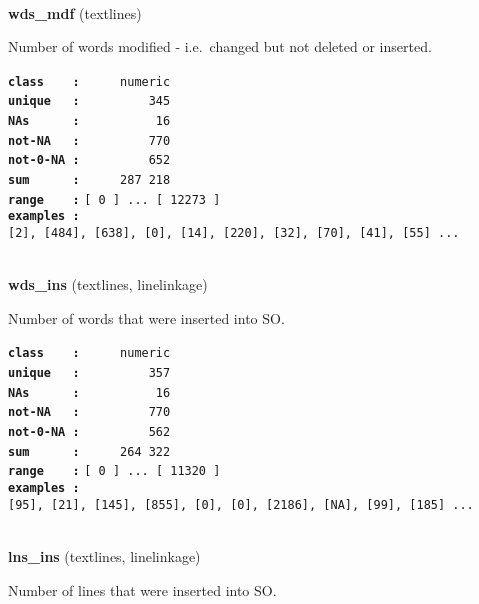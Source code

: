 \documentclass[]{article}
\begin{document}
~

\textbf{wds\_mdf} (textlines)

Number of words modified - i.e.~changed but not deleted or inserted.

\textbf{\texttt{class\ \ \ \ :}} \texttt{~~~~~numeric}\\
\textbf{\texttt{unique\ \ \ :}} \texttt{~~~~~~~~~345}\\
\textbf{\texttt{NAs\ \ \ \ \ \ :}} \texttt{~~~~~~~~~~16}\\
\textbf{\texttt{not-NA\ \ \ :}} \texttt{~~~~~~~~~770}\\
\textbf{\texttt{not-0-NA\ :}} \texttt{~~~~~~~~~652}\\
\textbf{\texttt{sum\ \ \ \ \ \ :}} \texttt{~~~~~287~218}\\
\textbf{\texttt{range\ \ \ \ :}}
\texttt{{[}\ 0\ {]}\ ...\ {[}\ 12273\ {]}}\\
\textbf{\texttt{examples\ :}}
\texttt{{[}2{]},\ {[}484{]},\ {[}638{]},\ {[}0{]},\ {[}14{]},\ {[}220{]},\ {[}32{]},\ {[}70{]},\ {[}41{]},\ {[}55{]}\ ...}\\

~

\textbf{wds\_ins} (textlines, linelinkage)

Number of words that were inserted into SO.

\textbf{\texttt{class\ \ \ \ :}} \texttt{~~~~~numeric}\\
\textbf{\texttt{unique\ \ \ :}} \texttt{~~~~~~~~~357}\\
\textbf{\texttt{NAs\ \ \ \ \ \ :}} \texttt{~~~~~~~~~~16}\\
\textbf{\texttt{not-NA\ \ \ :}} \texttt{~~~~~~~~~770}\\
\textbf{\texttt{not-0-NA\ :}} \texttt{~~~~~~~~~562}\\
\textbf{\texttt{sum\ \ \ \ \ \ :}} \texttt{~~~~~264~322}\\
\textbf{\texttt{range\ \ \ \ :}}
\texttt{{[}\ 0\ {]}\ ...\ {[}\ 11320\ {]}}\\
\textbf{\texttt{examples\ :}}
\texttt{{[}95{]},\ {[}21{]},\ {[}145{]},\ {[}855{]},\ {[}0{]},\ {[}0{]},\ {[}2186{]},\ {[}NA{]},\ {[}99{]},\ {[}185{]}\ ...}\\

~

\textbf{lns\_ins} (textlines, linelinkage)

Number of lines that were inserted into SO.
\end{document}

